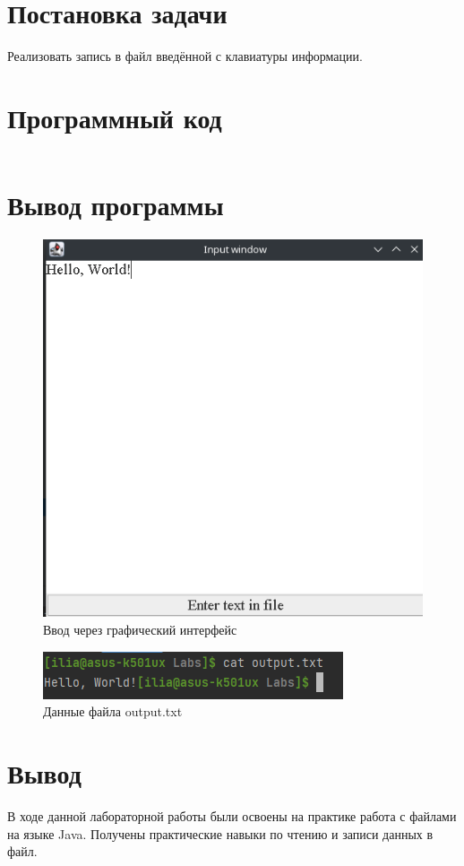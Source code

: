 \documentclass[14pt, a4paper]{extarticle}
\newenvironment{code}{\captionsetup{type=listing}}{}
\begin{document}
\section*{Постановка задачи}
Реализовать запись в файл введённой с клавиатуры информации.
\section*{Программный код}
\begin{code}
\inputminted[frame=single, fontsize=\footnotesize]{java}{Main.java}
\end{code}
\section*{Вывод программы}
\begin{figure}[H]
\centering
\includegraphics[scale=0.5]{output}
\caption{Ввод через графический интерфейс}
\end{figure}
\begin{figure}[H]
\centering
\includegraphics[scale=1]{terminal}
\caption{Данные файла output.txt}
\end{figure}
\section*{Вывод}
В ходе данной лабораторной работы были освоены на практике работа с файлами на языке Java. Получены практические навыки по чтению и записи данных в файл.
\end{document}

